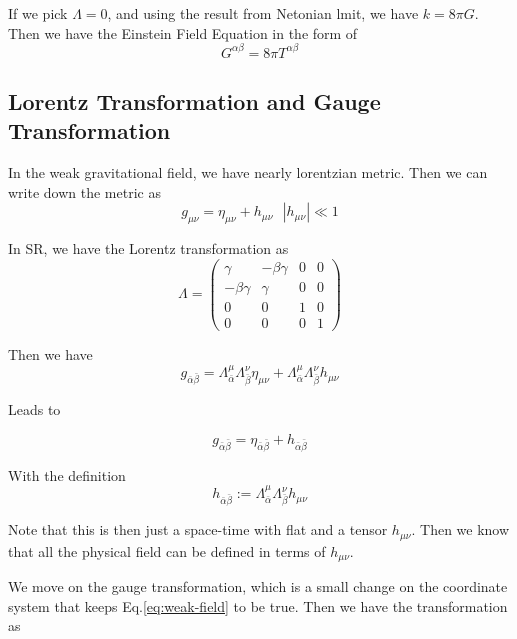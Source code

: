 \documentclass{article}
\begin{document}
If we pick $\Lambda=0$, and using the result from Netonian lmit, we have $k=8\pi G$. Then we have the Einstein Field Equation in the form of
\begin{equation}
    G^{\alpha\beta}=8\pi T^{\alpha\beta}
\end{equation}

\subsection{Lorentz Transformation and Gauge Transformation}

In the weak gravitational field, we have nearly lorentzian metric. Then we can write down the metric as
\begin{equation}
    g_{\mu\nu}=\eta_{\mu\nu}+h_{\mu\nu} ~~~|h_{\mu\nu}|\ll 1
    \label{eq:weak-field}
\end{equation}

In SR, we have the Lorentz transformation as
\begin{equation}
    \Lambda = \begin{pmatrix}
\gamma & -\beta\gamma & 0 & 0 \\
-\beta\gamma & \gamma & 0 & 0 \\
0 & 0 & 1 & 0 \\
0 & 0 & 0 & 1
\end{pmatrix}
\end{equation}

Then we have 
\begin{equation}
    g_{\bar{\alpha}\bar{\beta}}=\Lambda^\mu_{\bar{\alpha}}\Lambda^\nu_{\bar{\beta}} \eta_{\mu\nu} + \Lambda^\mu_{\bar{\alpha}} \Lambda^\nu_{\bar{\beta}} h_{\mu\nu}
\end{equation}

Leads to

\begin{equation}
    g_{\bar{\alpha}\bar{\beta}} = \eta_{\bar{\alpha}\bar{\beta}}+h_{\bar{\alpha}\bar{\beta}}
\end{equation}

With the definition
\begin{equation}
    \boxed{h_{\bar{\alpha}\bar{\beta}}:=\Lambda^\mu_{\bar{\alpha}}\Lambda^\nu_{\bar{\beta}}h_{\mu\nu}}
\end{equation}

Note that this is then just a space-time with flat and a tensor $h_{\mu\nu}$. Then we know that all the physical field can be defined in terms of $h_{\mu\nu}$.

We move on the gauge transformation, which is a small change on the coordinate system that keeps Eq.\ref{eq:weak-field} to be true. Then we have the transformation as
\end{document}
